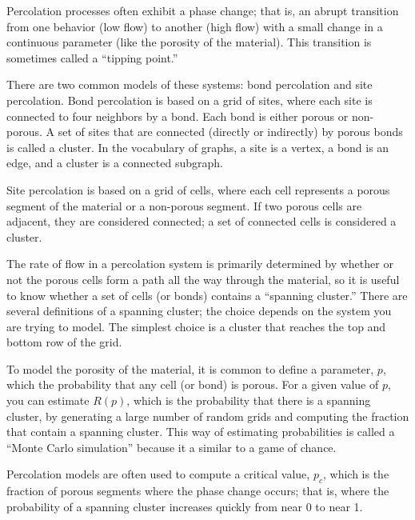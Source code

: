 \documentclass[10pt]{book}
\begin{document}
Percolation processes often exhibit a phase change; that is, an
abrupt transition from one behavior (low flow) to another
(high flow) with a small change in a continuous parameter (like
the porosity of the material).  This transition is sometimes
called a ``tipping point.''

There are two common models of these systems: bond percolation
and site percolation.  Bond percolation is based on a grid
of sites, where each site is connected to four neighbors by
a bond.  Each bond is either porous or non-porous.  A set of sites
that are connected (directly or indirectly) by porous bonds is
called a cluster.  In the vocabulary of graphs, a site is a vertex,
a bond is an edge, and a cluster is a connected subgraph.

Site percolation is based on a grid of cells, where each cell
represents a porous segment of the material or a non-porous segment.
If two porous cells are adjacent, they are considered connected; a set
of connected cells is considered a cluster.

The rate of flow in a percolation system is primarily determined by
whether or not the porous cells form a path all the way through the
material, so it is useful to know whether a set of cells (or bonds)
contains a ``spanning cluster.''  There are several
definitions of a spanning cluster; the choice depends on the system
you are trying to model. The simplest choice is a cluster that reaches
the top and bottom row of the grid.

To model the porosity of the material, it is common to define
a parameter, $p$, which the probability that any cell (or bond)
is porous.  For a given value of $p$, you can estimate 
$R(p)$, which is the probability that there is a spanning cluster,
by generating a large number of random grids and computing the
fraction that contain a spanning cluster.  This way of estimating
probabilities is called a ``Monte Carlo simulation'' because
it a similar to a game of chance.

Percolation models are often used to compute a critical value,
$p_c$, which is the fraction of porous segments where the phase
change occurs; that is, where the probability of a spanning cluster
increases quickly from near 0 to near 1.
\end{document}
